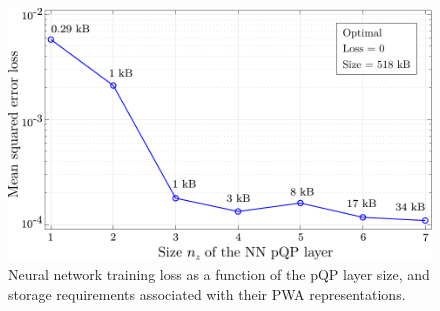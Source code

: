 \begin{figure}[h]
	\vspace{35pt}
	\begin{center}
		\includegraphics[scale=0.5]{../images/chap4_sim_res_loss_weight.pdf}    %
		\caption{Neural network training loss as a function of the	pQP layer size, and storage requirements associated with their PWA representations.} 
		\label{fig:niceSlices}
	\end{center}
\end{figure}

